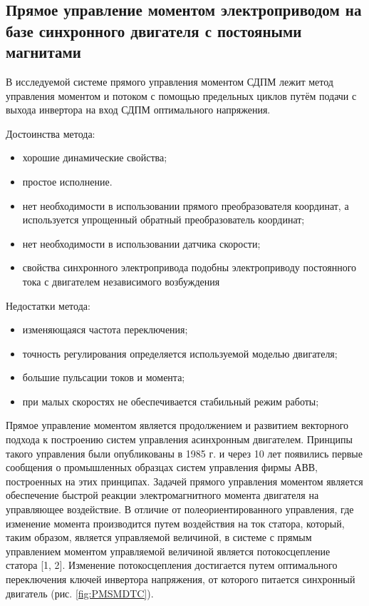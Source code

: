 \subsection{Прямое управление моментом электроприводом на базе синхронного двигателя с постояными магнитами}

В исследуемой системе прямого управления моментом
СДПМ лежит метод управления моментом и потоком с помощью
предельных циклов путём подачи с выхода инвертора на вход
СДПМ оптимального напряжения.

\noindent Достоинства метода:
\begin{itemize}
	\item хорошие динамические свойства;
	\item простое исполнение.
	\item нет необходимости в использовании прямого преобразователя
	координат, а используется упрощенный обратный преобразователь
	координат;
	\item нет необходимости в использовании датчика скорости;
	\item свойства синхронного электропривода подобны электроприводу постоянного тока с двигателем независимого
	возбуждения
\end{itemize}

\noindent Недостатки метода:
\begin{itemize}
	\item изменяющаяся частота переключения;
	\item точность регулирования определяется используемой моделью двигателя;
	\item большие пульсации токов и момента;
	\item при малых скоростях не обеспечивается стабильный режим
	работы;
	
\end{itemize}

Прямое управление моментом является продолжением и развитием векторного подхода к построению систем управления асинхронным двигателем. Принципы такого управления были опубликованы в 1985 г. и через 10 лет появились первые сообщения о промышленных образцах систем управления фирмы АВВ, построенных на этих принципах.
Задачей прямого управления моментом является обеспечение быстрой реакции электромагнитного момента двигателя на управляющее воздействие. В отличие от полеориентированного управления, где изменение момента производится путем воздействия на ток статора, который, таким образом, является управляемой величиной, в системе с прямым управлением моментом управляемой величиной является потокосцепление статора [1, 2]. Изменение потокосцепления достигается путем оптимального переключения ключей инвертора напряжения, от которого питается синхронный двигатель  (рис. \ref{fig:PMSMDTC}). 

